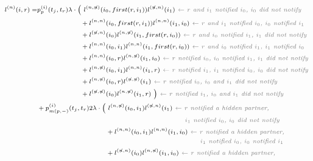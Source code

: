 \documentclass[10pt,letterpaper]{article}
\begin{document}
 
\begin{equation}
\scriptsize
\begin{split}
l^{(n)}(i, r) = &p_{p}^{(i)}(t_j,t_r) \lambda \cdot
\Big(~l^{(n,\not{n})}(i_0,first(r,i_1))l^{(\not{n},n)}(i_1) \textit{\color{gray}~$\leftarrow$ $r$ and $i_1$ notified $i_0$, $i_0$ did not notify} \\
&~~~~~~~~~~~~~~~~~~~+ l^{(n,n)}(i_0,first(r,i_1))l^{(n,n)}(i_1, i_0) \textit{\color{gray}~$\leftarrow$ $r$ and $i_1$ notified $i_0$, $i_0$ notified $i_1$} \\
&~~~~~~~~~~~~~~~~~~~+l^{(\not{n},n)}(i_0)l^{(n,\not{n})}(i_1,first(r,i_0)) \textit{\color{gray}~$\leftarrow$ $r$ and $i_0$ notified $i_1$, $i_1$ did not notify} \\
&~~~~~~~~~~~~~~~~~~~+ l^{(n,n)}(i_0, i_1)l^{(n,n)}(i_1,first(r,i_0)) \textit{\color{gray}~$\leftarrow$ $r$ and $i_0$ notified $i_1$, $i_1$ notified $i_0$} \\
&~~~~~~~~~~~~~~~~~~~+l^{(n,n)}(i_0,r)l^{(n,\not{n})}(i_1, i_0) \textit{\color{gray}~$\leftarrow$ $r$ notified $i_0$, $i_0$ notified $i_1$, $i_1$ did not notify} \\
&~~~~~~~~~~~~~~~~~~~+ l^{(n,\not{n})}(i_0, i_1)l^{(n,n)}(i_1,r) \textit{\color{gray}~$\leftarrow$ $r$ notified $i_1$, $i_1$ notified $i_0$, $i_0$ did not notify} \\
&~~~~~~~~~~~~~~~~~~~+l^{(n,\not{n})}(i_0,r)l^{(\not{n},\not{n})}(i_1) \textit{\color{gray}~$\leftarrow$ $r$ notified $i_0$, $i_0$ and $i_1$ did not notify} \\
&~~~~~~~~~~~~~~~~~~~+ l^{(\not{n},\not{n})}(i_0)l^{(n,\not{n})}(i_1,r)~\Big) \textit{\color{gray}~$\leftarrow$ $r$ notified $i_1$, $i_0$ and $i_1$ did not notify} 
\\
&+ p_{m(p,-)}^{(i)}(t_j,t_r) 2 \lambda \cdot
\Big(~l^{(n,\not{n})}(i_0,i_1)l^{(\not{n},n)}(i_1) \textit{\color{gray}~$\leftarrow$ $r$ notified a hidden partner,} \\
&\textit{\color{gray}~~~~~~~~~~~~~~~~~~~~~~~~~~~~~~~~~~~~~~~~~~~~~~~~~~~~~~~~~~$i_1$ notified $i_0$, $i_0$ did not notify} \\
&~~~~~~~~~~~~~~~~~~~~~~~~~~~~~~+ l^{(n,n)}(i_0,i_1)l^{(n,n)}(i_1, i_0)\textit{\color{gray}~$\leftarrow$ $r$ notified a hidden partner,} \\
&\textit{\color{gray}~~~~~~~~~~~~~~~~~~~~~~~~~~~~~~~~~~~~~~~~~~~~~~~~~~~~~~~~~~~~~~~~$i_1$ notified $i_0$, $i_0$ notified $i_1$} \\
&~~~~~~~~~~~~~~~~~~~~~~~~~~~~~~+l^{(\not{n},n)}(i_0)l^{(n,\not{n})}(i_1,i_0) \textit{\color{gray}~$\leftarrow$ $r$ notified a hidden partner,} \\

\end{split}
\end{equation}
\end{document}
